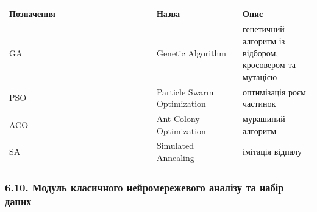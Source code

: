 \documentclass[12pt,a4paper]{article}
\begin{document}
{\def\LTcaptype{none} %

\begin{longtable}[]{@{}

  >{\raggedright\arraybackslash}p{0.4800\linewidth}

  >{\raggedright\arraybackslash}p{0.2800\linewidth}

  >{\raggedright\arraybackslash}p{0.2400\linewidth}@{}}

\toprule\noalign{}

\begin{minipage}[b]{\linewidth}\raggedright

Позначення

\end{minipage} & \begin{minipage}[b]{\linewidth}\raggedright

Назва

\end{minipage} & \begin{minipage}[b]{\linewidth}\raggedright

Опис

\end{minipage} \\

\midrule\noalign{}

\endhead

\bottomrule\noalign{}

\endlastfoot

GA & Genetic Algorithm & генетичний алгоритм із відбором, кросовером та мутацією \\

PSO & Particle Swarm Optimization & оптимізація роєм частинок \\

ACO & Ant Colony Optimization & мурашиний алгоритм \\

SA & Simulated Annealing & імітація відпалу \\

\end{longtable}

}



\subsubsection{6.10. Модуль класичного нейромережевого аналізу та набір даних}\label{ux43cux43eux434ux443ux43bux44c-ux43aux43bux430ux441ux438ux447ux43dux43eux433ux43e-ux43dux435ux439ux440ux43eux43cux435ux440ux435ux436ux435ux432ux43eux433ux43e-ux430ux43dux430ux43bux456ux437ux443-ux442ux430-ux43dux430ux431ux456ux440-ux434ux430ux43dux438ux445}
\end{document}
